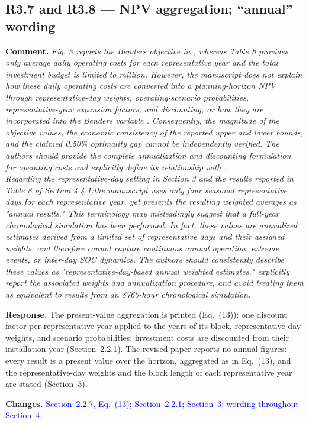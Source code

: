 \documentclass[11pt]{article}
\newcommand{\rcomment}[1]{\par\medskip\noindent\textbf{Comment.} \textit{#1}\par\smallskip}
\newcommand{\rresponse}[1]{\noindent\textbf{Response.} #1\par\smallskip}
\newcommand{\rchanges}[1]{\noindent\textbf{Changes.} \textcolor{blue}{#1}\par\medskip}
\begin{document}
\subsection*{R3.7 and R3.8 --- NPV aggregation; ``annual'' wording}
\rcomment{
Fig. 3 reports the Benders objective in , whereas Table 8 provides only average daily operating costs for each representative year and the total investment budget is limited to million. However, the manuscript does not explain how these daily operating costs are converted into a planning-horizon NPV through representative-day weights, operating-scenario probabilities, representative-year expansion factors, and discounting, or how they are incorporated into the Benders variable . Consequently, the magnitude of the objective values, the economic consistency of the reported upper and lower bounds, and the claimed 0.50\% optimality gap cannot be independently verified. The authors should provide the complete annualization and discounting formulation for operating costs and explicitly define its relationship with .\\
Regarding the representative-day setting in Section 3 and the results reported in Table 8 of Section 4.4.1:the manuscript uses only four seasonal representative days for each representative year, yet presents the resulting weighted averages as "annual results." This terminology may misleadingly suggest that a full-year chronological simulation has been performed. In fact, these values are annualized estimates derived from a limited set of representative days and their assigned weights, and therefore cannot capture continuous annual operation, extreme events, or inter-day SOC dynamics. The authors should consistently describe these values as "representative-day-based annual weighted estimates," explicitly report the associated weights and annualization procedure, and avoid treating them as equivalent to results from an 8760-hour chronological simulation.
}
\rresponse{The present-value aggregation is printed (Eq.~(13)): one discount factor per representative year applied to
the years of its block, representative-day weights, and scenario probabilities; investment costs are
discounted from their installation year (Section~2.2.1). The revised paper reports no annual figures: every result is a present value over the horizon, aggregated as in Eq.~(13), and the representative-day weights and the block length of each representative year are stated (Section~3).}
\rchanges{Section~2.2.7, Eq.~(13); Section~2.2.1; Section~3; wording throughout Section~4.}
\end{document}
